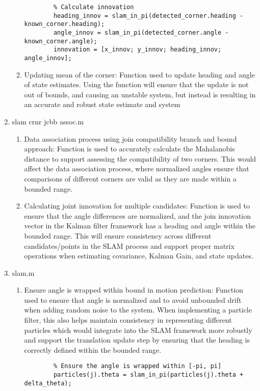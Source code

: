 \begin{enumerate}
\begin{enumerate}
        \begin{lstlisting}
        % Calculate innovation 
        heading_innov = slam_in_pi(detected_corner.heading - known_corner.heading);
        angle_innov = slam_in_pi(detected_corner.angle - known_corner.angle);
        innovation = [x_innov; y_innov; heading_innov; angle_innov];
        \end{lstlisting}
        \item Updating mean of the corner: Function used to update heading and angle of state estimates. Using the function will ensure that the update is not out of bounds, and causing an unstable system, but instead is resulting in an accurate and robust state estimate and system
    \end{enumerate}
    \item slam crnr jcbb assoc.m
    \begin{enumerate}
        \item Data association process using join compatibility branch and bound approach: Function is used to accurately calculate the Mahalanobis distance to support assessing the compatibility of two corners. This would affect the data association process, where normalized angles ensure that comparisons of different corners are valid as they are made within a bounded range.
        \item Calculating joint innovation for multiple candidates: Function is used to ensure that the angle differences are normalized, and the join innovation vector in the Kalman filter framework has a heading and angle within the bounded range. This will ensure consistency across different candidates/points in the SLAM process and support proper matrix operations when estimating covariance, Kalman Gain, and state updates.
    \end{enumerate}
    \item slam.m
    \begin{enumerate}
        \item Ensure angle is wrapped within bound in motion prediction: Function used to ensure that angle is normalized and to avoid unbounded drift when adding random noise to the system. When implementing a particle filter, this also helps maintain consistency in representing different particles which would integrate into the SLAM framework more robustly and support the translation update step by ensuring that the heading is correctly defined within the bounded range.
        \begin{lstlisting}
        % Ensure the angle is wrapped within [-pi, pi]
        particles(j).theta = slam_in_pi(particles(j).theta + delta_theta);
        \end{lstlisting}
    \end{enumerate}
\end{enumerate}
